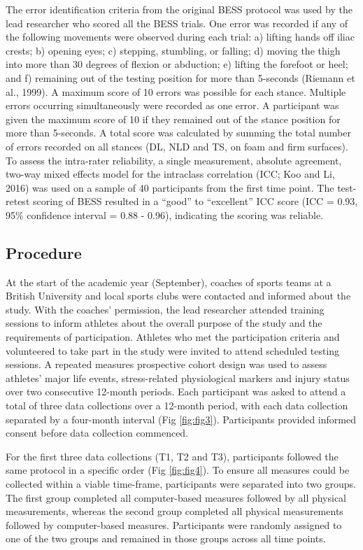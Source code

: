 \documentclass[
]{frontiersHLTH}
\begin{document}
The error identification criteria from the original BESS protocol was
used by the lead researcher who scored all the BESS trials. One error
was recorded if any of the following movements were observed during each
trial: a) lifting hands off iliac crests; b) opening eyes; c) stepping,
stumbling, or falling; d) moving the thigh into more than 30 degrees of
flexion or abduction; e) lifting the forefoot or heel; and f) remaining
out of the testing position for more than 5-seconds (Riemann et al.,
1999). A maximum score of 10 errors was possible for each stance.
Multiple errors occurring simultaneously were recorded as one error. A
participant was given the maximum score of 10 if they remained out of
the stance position for more than 5-seconds. A total score was
calculated by summing the total number of errors recorded on all stances
(DL, NLD and TS, on foam and firm surfaces). To assess the intra-rater
reliability, a single measurement, absolute agreement, two-way mixed
effects model for the intraclass correlation (ICC; Koo and Li, 2016) was
used on a sample of 40 participants from the first time point. The
test-retest scoring of BESS resulted in a ``good'' to ``excellent'' ICC
score (ICC = 0.93, 95\% confidence interval = 0.88 - 0.96), indicating
the scoring was reliable.

\hypertarget{procedure}{%
\subsection{Procedure}\label{procedure}}

At the start of the academic year (September), coaches of sports teams
at a British University and local sports clubs were contacted and
informed about the study. With the coaches' permission, the lead
researcher attended training sessions to inform athletes about the
overall purpose of the study and the requirements of participation.
Athletes who met the participation criteria and volunteered to take part
in the study were invited to attend scheduled testing sessions. A
repeated measures prospective cohort design was used to assess athletes'
major life events, stress-related physiological markers and injury
status over two consecutive 12-month periods. Each participant was asked
to attend a total of three data collections over a 12-month period, with
each data collection separated by a four-month interval (Fig
\ref{fig:fig3}). Participants provided informed consent before data
collection commenced.

For the first three data collections (T1, T2 and T3), participants
followed the same protocol in a specific order (Fig \ref{fig:fig4}). To
ensure all measures could be collected within a viable time-frame,
participants were separated into two groups. The first group completed
all computer-based measures followed by all physical measurements,
whereas the second group completed all physical measurements followed by
computer-based measures. Participants were randomly assigned to one of
the two groups and remained in those groups across all time points.
\end{document}
